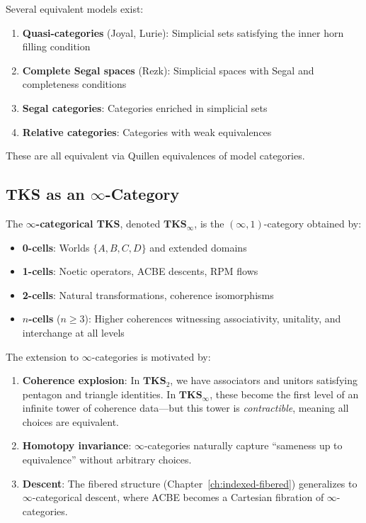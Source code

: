 \begin{remark}
\label{rem:infty-cat-models}
Several equivalent models exist:
\begin{enumerate}
  \item \textbf{Quasi-categories} (Joyal, Lurie): Simplicial sets satisfying
        the inner horn filling condition
  \item \textbf{Complete Segal spaces} (Rezk): Simplicial spaces with Segal
        and completeness conditions
  \item \textbf{Segal categories}: Categories enriched in simplicial sets
  \item \textbf{Relative categories}: Categories with weak equivalences
\end{enumerate}
These are all equivalent via Quillen equivalences of model categories.
\end{remark}

\subsection{TKS as an $\infty$-Category}
\label{subsec:tks-infty-cat}

\begin{definition}
\label{def:tks-infty}
The \textbf{$\infty$-categorical TKS}, denoted $\mathbf{TKS}_\infty$, is the
$(\infty, 1)$-category obtained by:
\begin{itemize}
  \item \textbf{0-cells}: Worlds $\{A, B, C, D\}$ and extended domains
  \item \textbf{1-cells}: Noetic operators, ACBE descents, RPM flows
  \item \textbf{2-cells}: Natural transformations, coherence isomorphisms
  \item \textbf{$n$-cells} ($n \geq 3$): Higher coherences witnessing
        associativity, unitality, and interchange at all levels
\end{itemize}
\end{definition}

\begin{remark}
\label{rem:why-infty}
The extension to $\infty$-categories is motivated by:
\begin{enumerate}
  \item \textbf{Coherence explosion}: In $\mathbf{TKS}_2$, we have associators
        and unitors satisfying pentagon and triangle identities. In
        $\mathbf{TKS}_\infty$, these become the first level of an infinite
        tower of coherence data---but this tower is \emph{contractible},
        meaning all choices are equivalent.
  \item \textbf{Homotopy invariance}: $\infty$-categories naturally capture
        ``sameness up to equivalence'' without arbitrary choices.
  \item \textbf{Descent}: The fibered structure (Chapter~\ref{ch:indexed-fibered})
        generalizes to $\infty$-categorical descent, where ACBE becomes a
        Cartesian fibration of $\infty$-categories.
\end{enumerate}
\end{remark}

